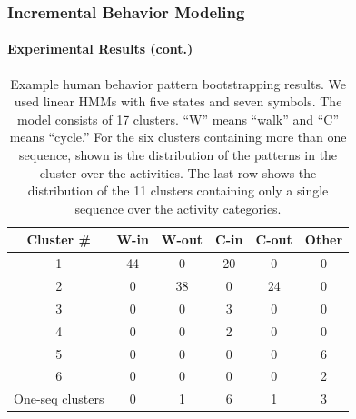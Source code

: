\begin{frame}
    \frametitle{Incremental Behavior Modeling}
    \framesubtitle{Experimental Results (cont.)}
    
    \begin{table}
        \caption{Example human behavior pattern bootstrapping
            results. We used linear HMMs with five states and seven
            symbols. The model consists of 17 clusters. ``W'' means ``walk''
            and ``C'' means ``cycle.'' For the six clusters containing more
            than one sequence, shown is the distribution of the patterns in
            the cluster over the activities.  The last row shows the
            distribution of the 11 clusters containing only a single sequence
            over the activity categories.}
        \centering
        \begin{tabular}{c|c|c|c|c|c}
            \hline
            Cluster \# & W-in & W-out & C-in & C-out & Other \\
            \hline \hline
            1 & 44 & 0  & 20 & 0  & 0 \\ \hline
            2 & 0  & 38 & 0  & 24 & 0 \\ \hline
            3 & 0  & 0  & 3  & 0  & 0 \\ \hline
            4 & 0  & 0  & 2  & 0  & 0 \\ \hline
            5 & 0  & 0  & 0  & 0  & 6 \\ \hline
            6 & 0  & 0  & 0  & 0  & 2 \\ \hline
            One-seq clusters & 0 & 1 & 6 & 1 & 3 \\ \hline
        \end{tabular}
        \label{tab:bootstrapping-results}
    \end{table}

\end{frame}


